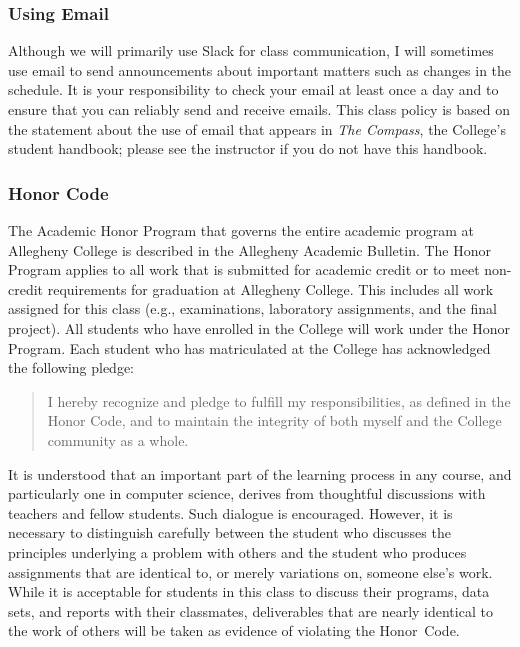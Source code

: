 \documentclass[11pt]{article}
\begin{document}
\subsubsection*{Using Email}

Although we will primarily use Slack for class communication, I will sometimes
use email to send announcements about important matters such as changes in the
schedule. It is your responsibility to check your email at least once a day and
to ensure that you can reliably send and receive emails. This class policy is
based on the statement about the use of email that appears in {\em The Compass},
the College's student handbook; please see the instructor if you do not have
this handbook.

\subsubsection*{Honor Code}

The Academic Honor Program that governs the entire academic program at Allegheny
College is described in the Allegheny Academic Bulletin. The Honor Program
applies to all work that is submitted for academic credit or to meet non-credit
requirements for graduation at Allegheny College. This includes all work
assigned for this class (e.g., examinations, laboratory assignments, and the
final project). All students who have enrolled in the College will work under
the Honor Program. Each student who has matriculated at the College has
acknowledged the following pledge:

\begin{quote}
  I hereby recognize and pledge to fulfill my responsibilities, as defined in the Honor Code, and to maintain the
  integrity of both myself and the College community as a whole.
\end{quote}

\noindent It is understood that an important part of the learning process in any
course, and particularly one in computer science, derives from thoughtful
discussions with teachers and fellow students. Such dialogue is encouraged.
However, it is necessary to distinguish carefully between the student who
discusses the principles underlying a problem with others and the student who
produces assignments that are identical to, or merely variations on, someone
else's work. While it is acceptable for students in this class to discuss their
programs, data sets, and reports with their classmates, deliverables that are
nearly identical to the work of others will be taken as evidence of violating
the \mbox{Honor Code}.
\end{document}
